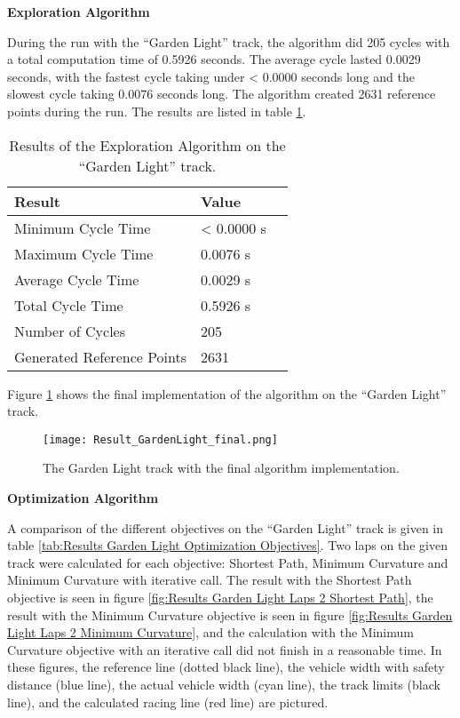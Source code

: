 \textbf{Exploration Algorithm}

During the run with the ``Garden Light'' track, the algorithm did 205 cycles with a total computation time of 0.5926 seconds. The average cycle lasted 0.0029 seconds, with the fastest cycle taking under < 0.0000 seconds long and the slowest cycle taking 0.0076 seconds long. The algorithm created 2631 reference points during the run. The results are listed in table \ref{tab:Results Garden Light Exploration}.

\begin{table}[H]
    \centering
    \begin{tabular}{|l|l|l|}
        \hline
        \textbf{Result}            & \textbf{Value} \\ \hline
        Minimum Cycle Time         & < 0.0000 s     \\ \hline
        Maximum Cycle Time         & 0.0076 s       \\ \hline
        Average Cycle  Time        & 0.0029 s       \\ \hline
        Total Cycle Time           & 0.5926 s       \\ \hline
        Number of Cycles           & 205            \\ \hline
        Generated Reference Points & 2631           \\ \hline
    \end{tabular}
    \caption{Results of the Exploration Algorithm on the ``Garden Light'' track.}
    \label{tab:Results Garden Light Exploration}
\end{table}

Figure \ref{fig:Result Garden Light Final} shows the final implementation of the algorithm on the ``Garden Light'' track.
\begin{figure}[H]
    \centering
    \texttt{[image: Result\_GardenLight\_final.png]}
    \caption{The Garden Light track with the final algorithm implementation.}
    \label{fig:Result Garden Light Final}
\end{figure}

\textbf{Optimization Algorithm}

A comparison of the different objectives on the ``Garden Light'' track is given in table \ref{tab:Results Garden Light Optimization Objectives}. Two laps on the given track were calculated for each objective: Shortest Path, Minimum Curvature and Minimum Curvature with iterative call. The result with the Shortest Path objective is seen in figure \ref{fig:Results Garden Light Laps 2 Shortest Path}, the result with the Minimum Curvature objective is seen in figure \ref{fig:Results Garden Light Laps 2 Minimum Curvature}, and the calculation with the Minimum Curvature objective with an iterative call did not finish in a reasonable time. In these figures, the reference line (dotted black line), the vehicle width with safety distance (blue line), the actual vehicle width (cyan line), the track limits (black line), and the calculated racing line (red line) are pictured.

